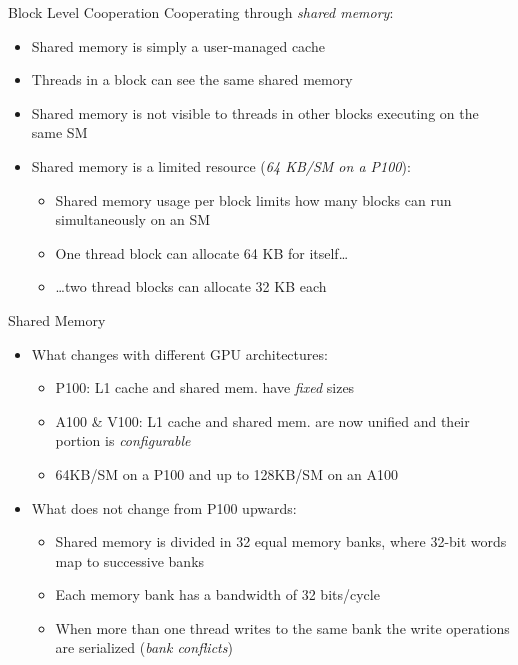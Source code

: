 \documentclass[aspectratio=43]{beamer}
\begin{document}
\begin{frame}[fragile]{Block Level Cooperation}
Cooperating through \emph{shared memory}:
\begin{itemize}
    \item Shared memory is simply a user-managed cache
    \item Threads in a block can see the same shared memory
    \item Shared memory is not visible to threads in other blocks executing on the same SM
    \item Shared memory is a limited resource (\emph{64 KB/SM on a P100}):
    \begin{itemize}
        \item Shared memory usage per block limits how many blocks can run simultaneously on an SM
        \item One thread block can allocate 64 KB for itself\dots
        \item \dots two thread blocks can allocate 32 KB each
    \end{itemize}
\end{itemize}

\end{frame}

\begin{frame}[fragile]{Shared Memory}
    \begin{itemize}
        \item What changes with different GPU architectures:
        \begin{itemize}
            \item P100: L1 cache and shared mem. have \emph{fixed} sizes
            \item A100 \& V100: L1 cache and shared mem. are now unified and their portion is \emph{configurable}
            \item 64KB/SM on a P100 and up to 128KB/SM on an A100
        \end{itemize}
        \vspace{0.25cm}
        \item What does not change from P100 upwards:
            \begin{itemize}
                \item Shared memory is divided in 32 equal memory banks, where 32-bit words map to successive banks
                \item Each memory bank has a bandwidth of 32 bits/cycle
                \item When more than one thread writes to the same bank the write operations are serialized (\emph{bank conflicts})
            \end{itemize}
        \end{itemize}

\end{frame}
\end{document}
